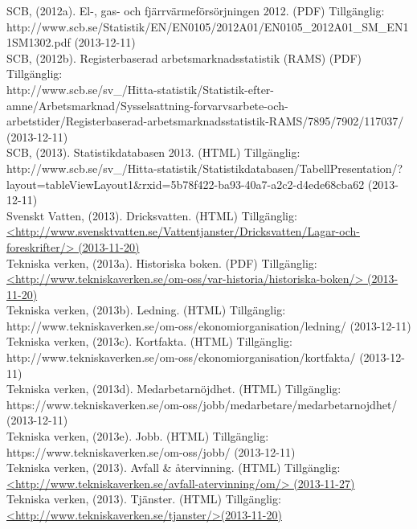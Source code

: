 \documentclass[10pt,a4paper]{article}
\begin{document}
SCB, (2012a). El-, gas- och fjärrvärmeförsörjningen 2012. (PDF) Tillgänglig:\\
http://www.scb.se/Statistik/EN/EN0105/2012A01/EN0105\_2012A01\_SM\_EN11SM1302.pdf (2013-12-11)\\

SCB, (2012b). Registerbaserad arbetsmarknadsstatistik (RAMS) (PDF) Tillgänglig:\\
http://www.scb.se/sv\_/Hitta-statistik/Statistik-efter-amne/Arbetsmarknad/Sysselsattning-forvarvsarbete-och-arbetstider/Registerbaserad-arbetsmarknadsstatistik-RAMS/7895/7902/117037/ (2013-12-11)\\

SCB, (2013). Statistikdatabasen 2013. (HTML) Tillgänglig:\\
http://www.scb.se/sv\_/Hitta-statistik/Statistikdatabasen/TabellPresentation/?layout=tableViewLayout1\&rxid=5b78f422-ba93-40a7-a2c2-d4ede68cba62 (2013-12-11)\\

Svenskt Vatten, (2013). Dricksvatten. (HTML) Tillgänglig: \\
\hyperref{http://www.svensktvatten.se/Vattentjanster/Dricksvatten/Lagar-och-foreskrifter/}{}{}{<http://www.svensktvatten.se/Vattentjanster/Dricksvatten/Lagar-och-foreskrifter/>
(2013-11-20)} \\

Tekniska verken, (2013a). Historiska boken. (PDF) Tillgänglig: \\
\hyperref{http://www.tekniskaverken.se/om-oss/var-historia/historiska-boken/}{}{}{<http://www.tekniskaverken.se/om-oss/var-historia/historiska-boken/> (2013-11-20)}\\

Tekniska verken, (2013b). Ledning. (HTML) Tillgänglig: \\
http://www.tekniskaverken.se/om-oss/ekonomiorganisation/ledning/ (2013-12-11)\\

Tekniska verken, (2013c). Kortfakta. (HTML) Tillgänglig: \\
http://www.tekniskaverken.se/om-oss/ekonomiorganisation/kortfakta/ (2013-12-11)\\

Tekniska verken, (2013d). Medarbetarnöjdhet. (HTML) Tillgänglig: \\
https://www.tekniskaverken.se/om-oss/jobb/medarbetare/medarbetarnojdhet/ (2013-12-11)\\

Tekniska verken, (2013e). Jobb. (HTML) Tillgänglig: \\
https://www.tekniskaverken.se/om-oss/jobb/ (2013-12-11)\\

Tekniska verken, (2013). Avfall \& återvinning. (HTML) Tillgänglig: \\
\hyperref{http://www.tekniskaverken.se/avfall-atervinning/om/}{}{}{<http://www.tekniskaverken.se/avfall-atervinning/om/> (2013-11-27)} \\

Tekniska verken, (2013). Tjänster. (HTML) Tillgänglig: \\
\hyperref{http://www.tekniskaverken.se/tjanster/}{}{}{<http://www.tekniskaverken.se/tjanster/>(2013-11-20)}\\
\end{document}
